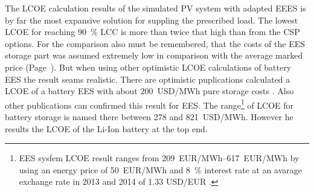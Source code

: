 The LCOE calculation results of the simulated PV system with adapted EEES is by far the most expansive solution for suppling the prescribed load. The lowest LCOE for reaching \SI{90}{\percent} LCC is more than twice that high than from the CSP options. For the comparison also must be remembered, that the costs of the EES storage part was assumed extremely low in comparison with the average marked price (Page~\pageref{SUBSUBPVFinancialparameter}). But when using other optimistic LCOE calculations of battery EES the result seams realistic. There are optimistic puplications calculated a LCOE of a battery EES with about \SI{200}{USD/MWh} pure storage costs \cite{Corcuera2015}. Also other publications can confirmed this result for EES. The range\footnote{EES sysfem LCOE result ranges from \SIrange{209}{617}{EUR/MWh} by using an energy price of \SI{50}{EUR/MWh} and \SI{8}{\percent} interest rate \cite{Zakeri2015} at an avarage exchange rate in 2013 and 2014 of 1.33 USD/EUR \cite{StatistaGmbH2015}.} of LCOE for battery storage is named there between 278 and \SI{821}{USD/MWh}. However he results the LCOE of the Li-Ion battery at the top end.




